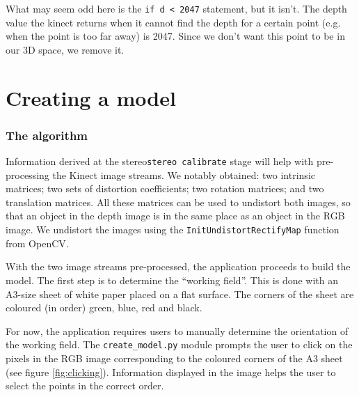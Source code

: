 What may seem odd here is the \verb|if d < 2047| statement, but it isn't. The
depth value the kinect returns when it cannot find the depth for a certain point
(e.g. when the point is too far away) is 2047. Since we don't want this point to
be in our 3D space, we remove it.

\section{Creating a model}

\subsubsection{The algorithm}


Information derived at the stereo\texttt{stereo calibrate} stage will help with
pre-processing the Kinect image streams. We notably obtained: two intrinsic
matrices; two sets of distortion coefficients; two rotation matrices; and two
translation matrices. All these matrices can be used to undistort both images,
so that an object in the depth image is in the same place as an object in the
RGB image. We undistort the images using the \texttt{InitUndistortRectifyMap}
function from OpenCV.

With the two image streams pre-processed, the application proceeds to build the
model. The first step is to determine the ``working field''. This is done with
an A3-size sheet of white paper placed on a flat surface. The corners of the
sheet are coloured (in order) green, blue, red and black.

For now, the application requires users to manually determine the orientation of
the working field. The \texttt{create\_model.py} module prompts the user to
click on the pixels in the RGB image corresponding to the coloured corners of
the A3 sheet (see figure \ref{fig:clicking}). Information displayed in the image
helps the user to select the points in the correct order.

